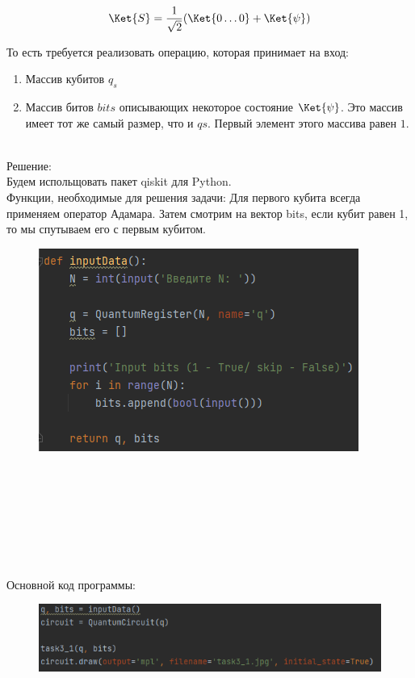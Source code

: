 \documentclass{article}
\begin{document}
$$\Ket{S} = \frac{1}{\sqrt2}(\Ket{0\dots0} +\Ket{\psi})$$

То есть требуется реализовать операцию, которая принимает на вход:

\begin{enumerate}
    \item Массив кубитов $q_s$
    \item Массив битов $bits$ описывающих некоторое состояние $\Ket{\psi}$. Это массив имеет тот же самый размер, что и $qs$. Первый элемент этого массива равен $1$.
\end{enumerate}\\
Решение:\\
Будем испольщовать пакет qiskit для Python.\\
Функции, необходимые для решения задачи:
Для первого кубита всегда применяем оператор Адамара. Затем смотрим на вектор bits, если кубит равен 1, то мы спутываем его с первым кубитом.
\begin{figure}[h]
        \centering
        \includegraphics{pictures/Code3.1.png}
   \end{figure} \\ \\ \\ \\ \\ \\ \\ 

Основной код программы:
\begin{figure}[h]
        \centering
        \includegraphics{pictures/main3.1.png}
   \end{figure} \\ 
\end{document}
